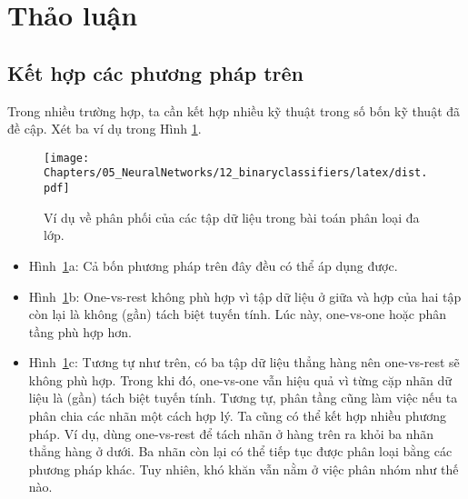 
 
\section{Thảo luận }
 
\subsection{Kết hợp các phương pháp trên}

 
Trong nhiều trường hợp, ta cần kết hợp nhiều kỹ thuật trong số bốn kỹ thuật đã
đề cập. Xét ba ví dụ trong Hình \ref{fig:10_4}.
 
\begin{figure}[t]
\centering
    \texttt{[image: Chapters/05\_NeuralNetworks/12\_binaryclassifiers/latex/dist.pdf]}
    \caption[]{Ví dụ về phân phối của các tập dữ liệu trong bài toán
    phân loại đa lớp.}
    \label{fig:10_4}
\end{figure}
\begin{itemize}
\item Hình~\ref{fig:10_4}a: Cả bốn phương pháp trên đây đều có thể áp dụng được. 
 
\item Hình~\ref{fig:10_4}b: One-vs-rest không phù hợp vì tập dữ liệu ở giữa và
hợp của hai tập còn lại là không (gần) {tách biệt tuyến tính}. Lúc này,
one-vs-one hoặc phân tầng phù hợp hơn.
 
\item Hình~\ref{fig:10_4}c: Tương tự như trên, có ba tập dữ liệu thẳng hàng
nên one-vs-rest sẽ không phù hợp. Trong khi đó, one-vs-one vẫn hiệu quả vì
từng cặp nhãn dữ liệu là (gần) {tách biệt tuyến tính}. Tương tự, phân tầng cũng
làm việc nếu ta phân chia các nhãn một cách hợp lý. Ta cũng có thể kết hợp
nhiều phương pháp. Ví dụ, dùng one-vs-rest để tách nhãn ở hàng trên ra khỏi ba nhãn
thẳng hàng ở dưới. Ba nhãn còn lại có thể tiếp tục được phân loại bằng các phương pháp khác. Tuy nhiên, khó khăn vẫn nằm ở việc phân nhóm như thế nào. 
\end{itemize}

